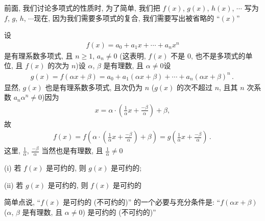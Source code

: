 前面, 我们讨论多项式的性质时, 为了简单, 我们把 $f(x)$, $g(x)$, $h(x)$, $\cdots$ 写为 $f$, $g$, $h$, $\cdots$\period 现在, 因为我们需要多项式的复合, 我们需要写出被省略的 ``$(x)$''\period

\begin{proposition}
    设
    \begin{align*}
        f(x) = a_0 + a_1 x + \cdots + a_n x^n
    \end{align*}
    是有理系数多项式, 且 $n \geq 1$, $a_n \neq 0$ (这表明, $f(x)$ 不是 $0$, 也不是多项式的单位, 且 $f(x)$ 的次为 $n$)\period 设 $\alpha$, $\beta$ 是有理数, 且 $\alpha \neq 0$\period 设
    \begin{align*}
        g(x) = f(\alpha x + \beta) = a_0 + a_1 (\alpha x + \beta) + \cdots + a_n (\alpha x + \beta)^n \period
    \end{align*}
    显然, $g(x)$ 也是有理系数多项式, 且次仍为 $n$ ($g(x)$ 的次不超过 $n$, 且其 $n$ 次系数 $a_n \alpha^n \neq 0$)\period 因为
    \begin{align*}
        x = \alpha \cdot \left( \frac{1}{\alpha} x + \frac{-\beta}{\alpha} \right) + \beta,
    \end{align*}
    故
    \begin{align*}
        f(x) = f\left( \alpha \cdot \left( \frac{1}{\alpha} x + \frac{-\beta}{\alpha} \right) + \beta \right) = g\left( \frac{1}{\alpha} x + \frac{-\beta}{\alpha} \right) \period
    \end{align*}
    这里, $\frac{1}{\alpha}$, $\frac{-\beta}{\alpha}$ 当然也是有理数, 且 $\frac{1}{\alpha} \neq 0$\period

    (i) 若 $f(x)$ 是可约的, 则 $g(x)$ 是可约的;

    (ii) 若 $g(x)$ 是可约的, 则 $f(x)$ 是可约的\period

    简单点说, ``$f(x)$ 是可约的 (不可约的)'' 的一个必要与充分条件是: ``$f(\alpha x + \beta)$ ($\alpha$, $\beta$ 是有理数, 且 $\alpha \neq 0$) 是可约的 (不可约的)''\period
\end{proposition}

